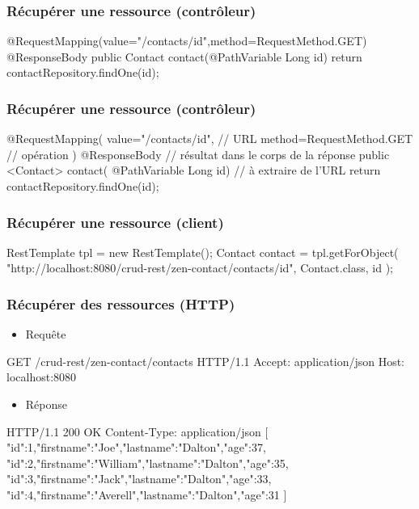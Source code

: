 \begin{frame}[fragile]
 \frametitle{Récupérer une ressource (contrôleur)}
 
 \begin{javacode}
@RequestMapping(value="/contacts/{id}",method=RequestMethod.GET)   
@ResponseBody                 
public Contact contact(@PathVariable Long id) {  
  return contactRepository.findOne(id);
}
 \end{javacode}  

\end{frame}

\begin{frame}[fragile]
 \frametitle{Récupérer une ressource (contrôleur)}
 
 \begin{javacode}
@RequestMapping(
  value="/contacts/{id}",     // URL
  method=RequestMethod.GET    // op\'eration
)
@ResponseBody                 // r\'esultat dans le corps de la r\'eponse
public <Contact> contact(
    @PathVariable Long id) {  // \`a extraire de l'URL
  return contactRepository.findOne(id);
}
 \end{javacode}  

\end{frame}

\begin{frame}[fragile]
 \frametitle{Récupérer une ressource (client)}
 
 \begin{javacode}
RestTemplate tpl = new RestTemplate();
Contact contact = tpl.getForObject(
  "http://localhost:8080/crud-rest/zen-contact/contacts/{id}", 
  Contact.class,
  id
);
 \end{javacode}  

\end{frame}

\begin{frame}[fragile]
 \frametitle{Récupérer des ressources (HTTP)}
 
 \begin{itemize}
  \item Requête
 \end{itemize} 
 
 \begin{textcode}
GET /crud-rest/zen-contact/contacts HTTP/1.1
Accept: application/json
Host: localhost:8080
 \end{textcode}
 
  \begin{itemize}
  \item Réponse
 \end{itemize} 
 
 \begin{textcode}
HTTP/1.1 200 OK
Content-Type: application/json
[
 {"id":1,"firstname":"Joe","lastname":"Dalton","age":37},
 {"id":2,"firstname":"William","lastname":"Dalton","age":35},
 {"id":3,"firstname":"Jack","lastname":"Dalton","age":33},
 {"id":4,"firstname":"Averell","lastname":"Dalton","age":31}
]
 \end{textcode}

\end{frame}

